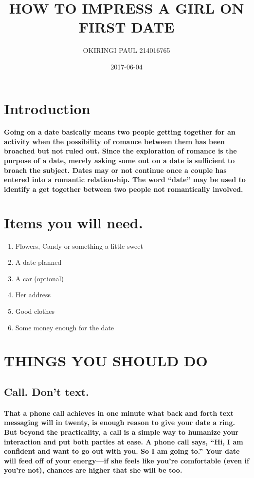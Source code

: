 \documentclass[11pt]{report}
\title{HOW TO IMPRESS A GIRL ON FIRST DATE}
\author{OKIRINGI PAUL 214016765}
\date{2017-06-04}
\begin{document}
\maketitle


\section{Introduction}
\paragraph{Going on a date basically means two people getting together for an activity when the possibility of romance between them has been broached but not ruled out. Since the exploration of romance is the purpose of a date, merely asking some out on a date is sufficient to broach the subject. Dates may or not continue once a couple has entered into a romantic relationship. The word “date” may be used to identify a get together between two people not romantically involved.}

\section{Items you will need.}
\begin{enumerate}
	\item Flowers, Candy or something a little sweet
	\item A date planned
	\item A car (optional)
	\item Her address
	\item Good clothes
	\item Some money enough for the date
\end{enumerate}
\section{THINGS YOU SHOULD DO}
\subsection{Call. Don’t text. }
\paragraph{That a phone call achieves in one minute what back and forth text messaging will in twenty, is enough reason to give your date a ring. But beyond the practicality, a call is a simple way to humanize your interaction and put both parties at ease. A phone call says, “Hi, I am confident and want to go out with you. So I am going to.” Your date will feed off of your energy—if she feels like you’re comfortable (even if you’re not), chances are higher that she will be too.}
\end{document}
